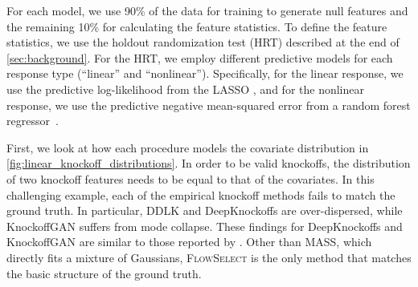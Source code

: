\documentclass{article}
\newcommand{\FlowSelect}{\textsc{FlowSelect}\xspace}
\begin{document}
For each model, we use 90\% of the data for training to generate null features and the remaining 10\% for calculating the feature statistics.
To define the feature statistics, we use the holdout randomization test (HRT) described at the end of \cref{sec:background}.
For the HRT, we employ different predictive models for each response type (``linear'' and ``nonlinear''). 
Specifically, for the linear response, we use the predictive log-likelihood from the LASSO \citep{tibshirani96regression}, and for the nonlinear response, we use the predictive negative mean-squared error from a random forest regressor~\citep{breiman2001random}.

First, we look at how each procedure models the covariate distribution in \cref{fig:linear_knockoff_distributions}.
In order to be valid knockoffs, the distribution of two knockoff features needs to be equal to that of the covariates.
In this challenging example, each of the empirical knockoff methods fails to match the ground truth.
In particular, DDLK and DeepKnockoffs are over-dispersed, while KnockoffGAN suffers from mode collapse. These findings for DeepKnockoffs and KnockoffGAN are similar to those reported by \citet{sudarshanDeepDirectLikelihood2020}.
Other than MASS, which directly fits a mixture of Gaussians,
\FlowSelect is the only method that matches the basic structure of the ground truth.
\end{document}
